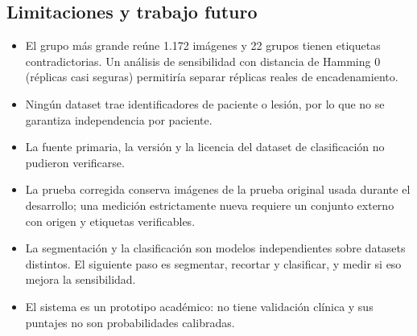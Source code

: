 \documentclass[conference]{IEEEtran}
\begin{document}
	\subsection*{Limitaciones y trabajo futuro}
	\begin{itemize}
		\item El grupo más grande reúne 1.172 imágenes y 22 grupos tienen etiquetas contradictorias. Un análisis de sensibilidad con distancia de Hamming 0 (réplicas casi seguras) permitiría separar réplicas reales de encadenamiento.
		\item Ningún dataset trae identificadores de paciente o lesión, por lo que no se garantiza independencia por paciente.
		\item La fuente primaria, la versión y la licencia del dataset de clasificación no pudieron verificarse.
		\item La prueba corregida conserva imágenes de la prueba original usada durante el desarrollo; una medición estrictamente nueva requiere un conjunto externo con origen y etiquetas verificables.
		\item La segmentación y la clasificación son modelos independientes sobre datasets distintos. El siguiente paso es segmentar, recortar y clasificar, y medir si eso mejora la sensibilidad.
		\item El sistema es un prototipo académico: no tiene validación clínica y sus puntajes no son probabilidades calibradas.
	\end{itemize}
	
\end{document}
